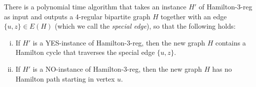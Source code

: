 \documentclass[runningheads]{llncs}
\newcommand{\xxxHAM}{{\sc Hamilton-3-reg}}
\newcommand{\lasse}[1]{#1}
\begin{document}
\begin{lemma}
\label{le:Ham-to-Ham}
There is a polynomial time algorithm that takes an instance $H'$ of {\xxxHAM} as input and outputs 
a 4-regular bipartite graph $H$ together with an edge $\{u,z\}\in E(H)$ \lasse{(which we call the \emph{special edge})},
so that the following holds:
\begin{enumerate}[(i)]
\item If $H'$ is a YES-instance of {\xxxHAM}, then the new graph $H$ contains a Hamilton cycle 
that traverses the special edge $\{u,z\}$.
\item If $H'$ is a NO-instance of {\xxxHAM}, then the new graph $H$ has no Hamilton path
starting in vertex $u$. 
\end{enumerate}
\end{lemma}
\end{document}
